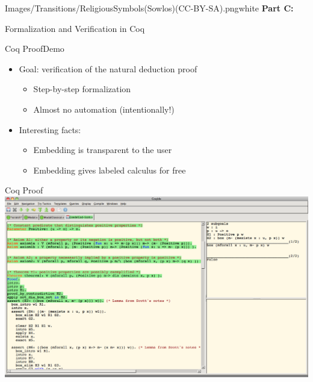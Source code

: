 \begin{transitionframe}{Images/Transitions/ReligiousSymbols(Sowlos)(CC-BY-SA).png}{white}
\textbf{Part C:}

Formalization and Verification in Coq
\end{transitionframe}

\begin{frame}{Coq Proof}{Demo}
\begin{itemize}
\item \begin{LARGE} Goal: verification of the natural deduction proof \end{LARGE}
\begin{itemize}
\item \begin{large} Step-by-step formalization \end{large}
\pause
\item \begin{large} Almost no automation (intentionally!) \end{large}
\end{itemize}
%
\pause
\item \begin{LARGE} Interesting facts: \end{LARGE}
\begin{itemize}
\item \begin{large} Embedding is transparent to the user \end{large}
\pause
\item \begin{large} Embedding gives labeled calculus for free \end{large}
\end{itemize}
\end{itemize}
\end{frame}

\begin{frame}{Coq Proof}
\colorbox{gray}{\includegraphics[width=\textwidth]{Images/Demos/CoqDemo.png}}
\end{frame}
